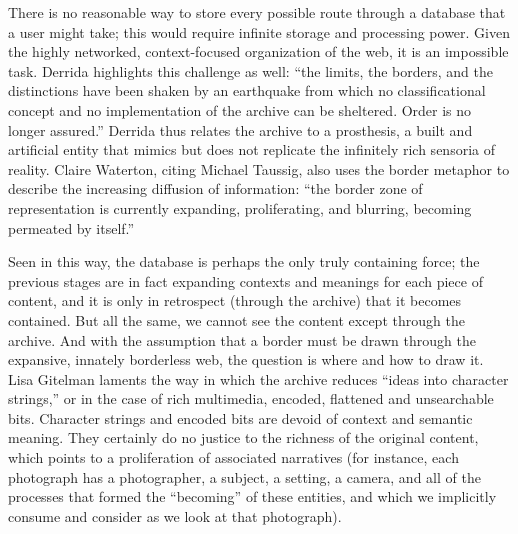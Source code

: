 There is no reasonable way to store every possible route through a database that a user might take; this would require infinite storage and processing power. Given the highly networked, context-focused organization of the web, it is an impossible task. Derrida highlights this challenge as well: “the limits, the borders, and the distinctions have been shaken by an earthquake from which no classificational concept and no implementation of the archive can be sheltered. Order is no longer assured.”  Derrida thus relates the archive to a prosthesis, a built and artificial entity that mimics but does not replicate the infinitely rich sensoria of reality. Claire Waterton, citing Michael Taussig, also uses the border metaphor to describe the increasing diffusion of information: “the border zone of representation is currently expanding, proliferating, and blurring, becoming permeated by itself.” 

Seen in this way, the database is perhaps the only truly containing force; the previous stages are in fact expanding contexts and meanings for each piece of content, and it is only in retrospect (through the archive) that it becomes contained. But all the same, we cannot see the content except through the archive. And with the assumption that a border must be drawn through the expansive, innately borderless web, the question is where and how to draw it. Lisa Gitelman laments the way in which the archive reduces “ideas into character strings,” or in the case of rich multimedia, encoded, flattened and unsearchable bits.  Character strings and encoded bits are devoid of context and semantic meaning. They certainly do no justice to the richness of the original content, which points to a proliferation of associated narratives (for instance, each photograph has a photographer, a subject, a setting, a camera, and all of the processes that formed the “becoming” of these entities, and which we implicitly consume and consider as we look at that photograph).

